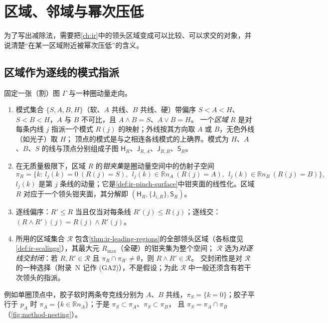 \section{区域、邻域与幂次压低}\label{sec:method-regions}

为了写出减除法，需要把\cref{ch:ir}中的领头区域变成可以比较、可以求交的对象，并说清楚“在某一区域附近被幂次压低”的含义。

\subsection{区域作为逐线的模式指派}

\begin{definition}[区域：逐线模式指派与偏序]\label{def:method-regions}
固定一张（割）图 $\Gamma$ 与一种圈动量走向。
\begin{enumerate}[label=(\roman*),leftmargin=2em,itemsep=1pt,topsep=2pt]
\item 模式集合 $\{S,A,B,H\}$（软、$A$ 共线、$B$ 共线、硬）带偏序 $S<A<H$、$S<B<H$，$A$ 与 $B$ 不可比，且 $A\wedge B=S$、$A\vee B=H$。
  一个\emph{区域} $R$ 是对每条内线 $j$ 指派一个模式 $R(j)$ 的映射；外线按其方向取 $A$ 或 $B$，无色外线（如光子）取 $H$；
  顶点的模式是与之相连各线模式的上确界。模式为 $H$、$A$、$B$、$S$ 的线与顶点分别组成子图 $\mathsf H_R$、$\mathsf J_{R,A}$、$\mathsf J_{R,B}$、$\mathsf S_R$。
\item 在无质量极限下，区域 $R$ 的\emph{钳夹集}是圈动量空间中的仿射子空间
  \begin{equation}\label{eq:method-pinchset}
  \pi_R=\bigl\{k:\ l_j(k)=0\ (R(j)=S),\ \ l_j(k)\in\mathbb Rn_A\ (R(j)=A),\ \ l_j(k)\in\mathbb Rn_B\ (R(j)=B)\bigr\},
  \end{equation}
  $l_j(k)$ 是第 $j$ 条线的动量；它是\cref{def:ir-pinch-surface}中钳夹面的线性化。区域 $R$ 对应于一个领头钳夹面，其分解即 $(\mathsf H_R,\{\mathsf J_{i,R}\},\mathsf S_R)$。
\item 逐线偏序：$R'\le R$ 当且仅当对每条线 $R'(j)\le R(j)$；逐线交：$(R\wedge R')(j)=R(j)\wedge R'(j)$。
\item 所用的区域集合 $\mathcal R$ 包含\cref{thm:ir-leading-regions}的全部领头区域（各标度见\cref{def:ir-scalings}），其最大元 $R_{\max}$（全硬）的钳夹集为整个空间；
  $\mathcal R$ 选为\emph{对逐线交封闭}：若 $R,R'\in\mathcal R$ 且 $\pi_R\cap\pi_{R'}\neq\emptyset$，则 $R\wedge R'\in\mathcal R$。
  交封闭性是对 $\mathcal R$ 的一种选择（附录~N 记作 (GA2)），不是假设；为此 $\mathcal R$ 中一般还须含有若干次领头的指派。
\end{enumerate}
例如单圈顶点中，胶子软时两条夸克线分别为 $A$、$B$ 共线，$\pi_S=\{k=0\}$；胶子平行于 $p_A$ 时 $\pi_A=\{k\in\mathbb Rn_A\}$；于是 $\pi_S\subset\pi_A$、$\pi_S\subset\pi_B$，
且 $\pi_S=\pi_A\cap\pi_B$（\cref{fig:method-nesting}）。
\end{definition}

